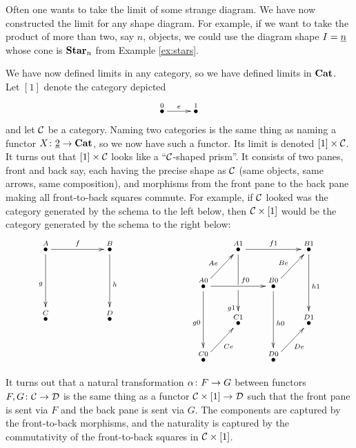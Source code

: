 \documentclass[CT4S-EN-RU]{subfiles}
\begin{document}
\begin{exampleENG}
Often one wants to take the limit of some strange diagram. We have now constructed the limit for any shape diagram. For example, if we want to take the product of more than two, say $n$, objects, we could use the diagram shape $I=\underline{n}$ whose cone is ${\mathbf{Star}}_n$ from Example \ref{ex:stars}.
\end{exampleENG}

\begin{exampleRUS}
\end{exampleRUS}

\begin{exampleENG}\label{ex:product version of nat trans}
We have now defined limits in any category, so we have defined limits in ${\mathbf{Cat}}$. Let $[1]$ denote the category depicted 
$$\xymatrix{\LMO{0}\ar[r]^e&\LMO{1}}$$
and let $\mathcal{C}$ be a category. Naming two categories is the same thing as naming a functor $X\colon\underline{2}\rightarrow{\mathbf{Cat}}$, so we now have such a functor. Its limit is denoted $[1]\times\mathcal{C}$. It turns out that $[1]\times\mathcal{C}$ looks like a “$\mathcal{C}$-shaped prism”. It consists of two panes, front and back say, each having the precise shape as $\mathcal{C}$ (same objects, same arrows, same composition), and morphisms from the front pane to the back pane making all front-to-back squares commute. For example, if $\mathcal{C}$ looked was the category generated by the schema to the left below, then $\mathcal{C}\times[1]$ would be the category generated by the schema to the right below:
$$
\xymatrix{
\LMO{A}\ar[rr]^f\ar[dd]_g&&\LMO{B}\ar[dd]^h\\\\\LMO{C}&&\LMO{D}
}
\hspace{1in}
\xymatrix@=20pt{
&\LMO{A1}\ar[rr]^{f1}\ar'[d][dd]_(.6){g1}&&\LMO{B1}\ar[dd]^{h1}\\
\LMO{A0}\ar[ur]^{Ae}\ar[rr]^(.6){f0}\ar[dd]_{g0}&&\LMO{B0}\ar[ur]^{Be}\ar[dd]^{h0}\\
&\LMO{C1}&&\LMO{D1}\\
\LMO{C0}\ar[ur]_{Ce}&&\LMO{D0}\ar[ur]_{De}&
}
$$

It turns out that a natural transformation $\alpha\colon F\rightarrow G$ between functors $F,G\colon\mathcal{C}\rightarrow\mathcal{D}$ is the same thing as a functor $\mathcal{C}\times[1]\rightarrow\mathcal{D}$ such that the front pane is sent via $F$ and the back pane is sent via $G$. The components are captured by the front-to-back morphisms, and the naturality is captured by the commutativity of the front-to-back squares in $\mathcal{C}\times[1]$.
\end{exampleENG}
\end{document}
